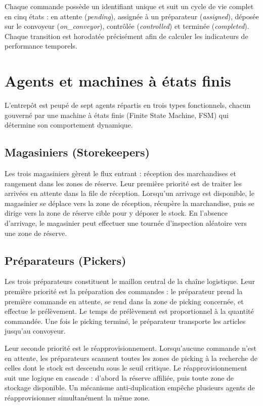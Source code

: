 \documentclass[12pt,a4paper]{report}
\begin{document}
Chaque commande poss\`ede un identifiant unique et suit un cycle de vie complet en cinq \'etats : en attente (\textit{pending}), assign\'ee \`a un pr\'eparateur (\textit{assigned}), d\'epos\'ee sur le convoyeur (\textit{on\_conveyor}), contr\^ol\'ee (\textit{controlled}) et termin\'ee (\textit{completed}). Chaque transition est horodat\'ee pr\'ecis\'ement afin de calculer les indicateurs de performance temporels.

\section{Agents et machines \`a \'etats finis}

L'entrep\^ot est peup\'e de sept agents r\'epartis en trois types fonctionnels, chacun gouvern\'e par une machine \`a \'etats finis (Finite State Machine, FSM) qui d\'etermine son comportement dynamique.

\subsection{Magasiniers (Storekeepers)}

Les trois magasiniers g\`erent le flux entrant : r\'eception des marchandises et rangement dans les zones de r\'eserve. Leur premi\`ere priorit\'e est de traiter les arriv\'ees en attente dans la file de r\'eception. Lorsqu'un arrivage est disponible, le magasinier se d\'eplace vers la zone de r\'eception, r\'ecup\`ere la marchandise, puis se dirige vers la zone de r\'eserve cible pour y d\'eposer le stock. En l'absence d'arrivage, le magasinier peut effectuer une tourn\'ee d'inspection al\'eatoire vers une zone de r\'eserve.

\subsection{Pr\'eparateurs (Pickers)}

Les trois pr\'eparateurs constituent le maillon central de la cha\^ine logistique. Leur premi\`ere priorit\'e est la pr\'eparation des commandes : le pr\'eparateur prend la premi\`ere commande en attente, se rend dans la zone de picking concern\'ee, et effectue le pr\'el\`evement. Le temps de pr\'el\`evement est proportionnel \`a la quantit\'e command\'ee. Une fois le picking termin\'e, le pr\'eparateur transporte les articles jusqu'au convoyeur.

Leur seconde priorit\'e est le r\'eapprovisionnement. Lorsqu'aucune commande n'est en attente, les pr\'eparateurs scannent toutes les zones de picking \`a la recherche de celles dont le stock est descendu sous le seuil critique. Le r\'eapprovisionnement suit une logique en cascade : d'abord la r\'eserve affili\'ee, puis toute zone de stockage disponible. Un m\'ecanisme anti-duplication emp\^eche plusieurs agents de r\'eapprovisionner simultan\'ement la m\^eme zone.
\end{document}
